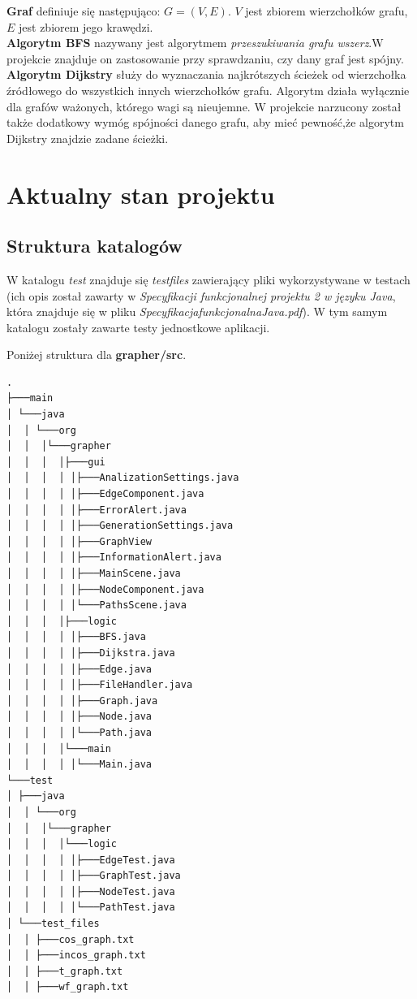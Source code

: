 \documentclass{article}
\begin{document}
\textbf{Graf} definiuje się następująco: $G=(V,E)$. $V$ jest zbiorem wierzchołków grafu, $E$ jest zbiorem jego krawędzi.
\vspace{5mm}
\\
\textbf{Algorytm BFS} nazywany jest algorytmem \emph{przeszukiwania grafu wszerz}.\linebreak W projekcie znajduje on zastosowanie przy sprawdzaniu, czy dany graf jest spójny.
\vspace{5mm}
\\
\textbf{Algorytm Dijkstry} służy do wyznaczania najkrótszych ścieżek od wierzchołka źródłowego do wszystkich innych wierzchołków grafu. Algorytm działa wyłącznie dla grafów ważonych, którego wagi są nieujemne. W projekcie narzucony został także dodatkowy wymóg spójności danego grafu, aby mieć pewność,\linebreak że algorytm Dijkstry znajdzie zadane ścieżki.

\section{Aktualny stan projektu}
\subsection{Struktura katalogów}

W katalogu \emph{test} znajduje się \emph{test\textunderscore files} zawierający pliki wykorzystywane \linebreak w testach (ich opis został zawarty w \emph{Specyfikacji funkcjonalnej projektu 2 \linebreak w języku Java}, która znajduje się w pliku \emph{Specyfikacja\textunderscore funkcjonalna\textunderscore Java.pdf}). W tym samym katalogu zostały zawarte testy jednostkowe aplikacji. 

Poniżej struktura dla \textbf{grapher/src}.

\begin{lstlisting}[style=tree]
.
├───main
│ └───java
│  │ └───org
│  │  │└───grapher
│  │  │  │├───gui
│  │  │  │ │├───AnalizationSettings.java
│  │  │  │ │├───EdgeComponent.java
│  │  │  │ │├───ErrorAlert.java
│  │  │  │ │├───GenerationSettings.java
│  │  │  │ │├───GraphView
│  │  │  │ │├───InformationAlert.java
│  │  │  │ │├───MainScene.java
│  │  │  │ │├───NodeComponent.java
│  │  │  │ │└───PathsScene.java
│  │  │  │├───logic
│  │  │  │ │├───BFS.java
│  │  │  │ │├───Dijkstra.java
│  │  │  │ │├───Edge.java
│  │  │  │ │├───FileHandler.java
│  │  │  │ │├───Graph.java
│  │  │  │ │├───Node.java
│  │  │  │ │└───Path.java
│  │  │  │└───main
│  │  │  │ │└───Main.java
└───test
│ ├───java
│  │ └───org
│  │  │└───grapher
│  │  │  │└───logic
│  │  │  │ │├───EdgeTest.java
│  │  │  │ │├───GraphTest.java
│  │  │  │ │├───NodeTest.java
│  │  │  │ │└───PathTest.java
│ └───test_files
│  │ ├───cos_graph.txt
│  │ ├───incos_graph.txt
│  │ ├───t_graph.txt
│  │ ├───wf_graph.txt
\end{lstlisting}
\end{document}
